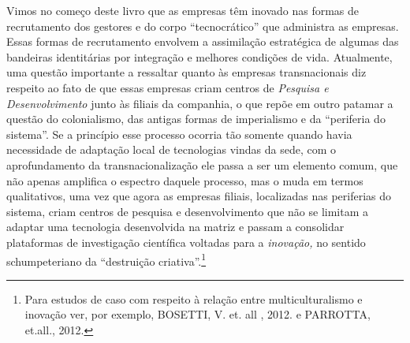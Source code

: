 Vimos no começo deste livro que as empresas têm inovado nas formas de
recrutamento dos gestores e do corpo ``tecnocrático'' que administra as
empresas. Essas formas de recrutamento envolvem a assimilação
estratégica de algumas das bandeiras identitárias por integração e
melhores condições de vida. Atualmente, uma questão importante a
ressaltar quanto às empresas transnacionais diz respeito ao fato de que
essas empresas criam centros de \emph{Pesquisa e Desenvolvimento} junto
às filiais da companhia, o que repõe em outro patamar a questão do
colonialismo, das antigas formas de imperialismo e da ``periferia do
sistema''. Se a princípio esse processo ocorria tão somente quando havia
necessidade de adaptação local de tecnologias vindas da sede, com o
aprofundamento da transnacionalização ele passa a ser um elemento comum,
que não apenas amplifica o espectro daquele processo, mas o muda em
termos qualitativos, uma vez que agora as empresas filiais, localizadas
nas periferias do sistema, criam centros de pesquisa e desenvolvimento
que não se limitam a adaptar uma tecnologia desenvolvida na matriz e
passam a consolidar plataformas de investigação científica voltadas para
a \emph{inovação,} no sentido schumpeteriano da ``destruição
criativa''.\footnote{Para estudos de caso com respeito à relação entre
  multiculturalismo e inovação ver, por exemplo, BOSETTI, V. et. all ,
  2012. e PARROTTA, et.all., 2012.}

